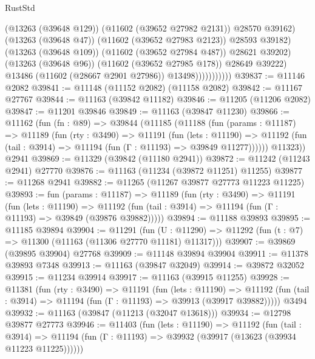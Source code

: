 \begin{lexlean}{RustStd}
\begin{coremodule}
                                  (@13263 (@39648 @129))
                                  (@11602 (@39652 @27982 @2131))
                                  @28570
                                  @39162)
                                (@13263 (@39648 @47))
                                (@11602 (@39652 @27983 @2123))
                                @28593
                                @39182)
                              (@13263 (@39648 @109))
                              (@11602 (@39652 @27984 @487))
                              @28621
                              @39202)
                            (@13263 (@39648 @96))
                            (@11602 (@39652 @27985 @178))
                            @28649
                            @39222)
                          @13486
                          (@11602 (@28667 @2901 @27986))
                          @13498)))))))))))
@39837 := @11146 @2082
@39841 := @11148 (@11152 @2082) (@11158 @2082)
@39842 := @11167 @27767
@39844 := @11163 (@39842 @11182)
@39846 := @11205 (@11206 @2082)
@39847 := @11201 @39846
@39849 := @11163 (@39847 @11230)
@39866 := @11162
    (fun (fn : @89) =>
    @39844
      (@11185
        (@11188
          (fun (params : @11187) =>
          @11189
            (fun (rty : @3490) =>
            @11191
              (fun (lets : @11190) =>
              @11192 (fun (tail : @3914) => @11194 (fun (Γ : @11193) => @39849 @11277))))))
        @11323))
    @2941
@39869 := @11329 (@39842 (@11180 @2941))
@39872 := @11242 (@11243 @2941) @27770
@39876 := @11163 (@11234 (@39872 @11251) @11255)
@39877 := @11268 @2941
@39882 := @11265 (@11267 @39877 @27773 @11223 @11225)
@39893 := fun (params : @11187) =>
  @11189
    (fun (rty : @3490) =>
    @11191
      (fun (lets : @11190) =>
      @11192 (fun (tail : @3914) => @11194 (fun (Γ : @11193) => @39849 (@39876 @39882)))))
@39894 := @11188 @39893
@39895 := @11185 @39894
@39904 := @11291
    (fun (U : @11290) => @11292 (fun (t : @7) => @11300 (@11163 (@11306 @27770 @11181) @11317)))
@39907 := @39869 (@39895 @39904) @27768
@39909 := @11148 @39894 @39904
@39911 := @11378 @39893 @7348
@39913 := @11163 (@39847 @32049)
@39914 := @39872 @32052
@39915 := @11234 @39914
@39917 := @11163 (@39915 @11255)
@39928 := @11381
    (fun (rty : @3490) =>
    @11191
      (fun (lets : @11190) =>
      @11192 (fun (tail : @3914) => @11194 (fun (Γ : @11193) => @39913 (@39917 @39882)))))
    @3494
@39932 := @11163 (@39847 (@11213 (@32047 @13618)))
@39934 := @12798 @39877 @27773
@39946 := @11403
    (fun (lets : @11190) =>
    @11192
      (fun (tail : @3914) =>
      @11194 (fun (Γ : @11193) => @39932 (@39917 (@13623 (@39934 @11223 @11225))))))

\end{coremodule}
\end{lexlean}
